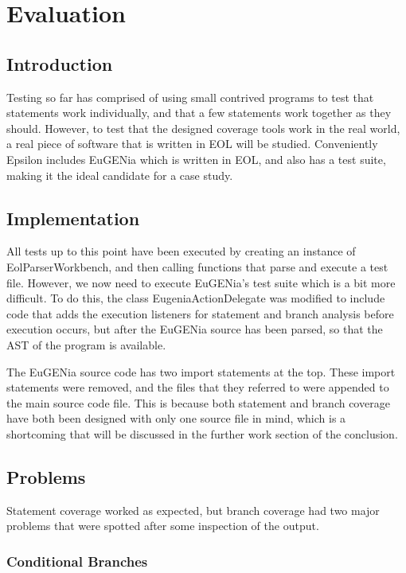 \chapter{Evaluation}
\label{chap:evaluation}

\section{Introduction}

Testing so far has comprised of using small contrived programs to test that statements work individually, and that a few statements work together as they should. However, to test that the designed coverage tools work in the real world, a real piece of software that is written in EOL will be studied. Conveniently Epsilon includes EuGENia which is written in EOL, and also has a test suite, making it the ideal candidate for a case study.

\section{Implementation}

All tests up to this point have been executed by creating an instance of EolParserWorkbench, and then calling functions that parse and execute a test file. However, we now need to execute EuGENia's test suite which is a bit more difficult. To do this, the class EugeniaActionDelegate was modified to include code that adds the execution listeners for statement and branch analysis before execution occurs, but after the EuGENia source has been parsed, so that the AST of the program is available.

The EuGENia source code has two import statements at the top. These import statements were removed, and the files that they referred to were appended to the main source code file. This is because both statement and branch coverage have both been designed with only one source file in mind, which is a shortcoming that will be discussed in the further work section of the conclusion.

\section{Problems}

Statement coverage worked as expected, but branch coverage had two major problems that were spotted after some inspection of the output. 

\subsection{Conditional Branches}

